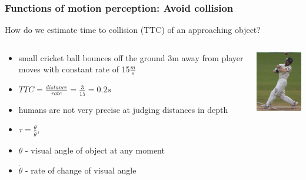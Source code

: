 \documentclass[]{beamer}
\begin{document}
\begin{frame}
\frametitle{Functions of motion perception: Avoid collision}
\begin{overlayarea}{110mm}{70mm}
How do we estimate time to collision (TTC) of an approaching object?\begin{columns}[T]
\begin{column}{70mm}
\begin{itemize}
 \item small cricket ball bounces off the ground 3m away from player moves with constant rate of 15$\frac{m}{s}$
 \item $TTC = \frac{distance}{rate} = \frac{3}{15} = 0.2s$
 \item humans are not very precise at judging distances in depth
 \item $\tau = \frac{\theta}{\dot{\theta}}$, 
  \item[] $\theta$ - visual angle of object at any moment
  \item[] $\dot{\theta}$ - rate of change of visual angle 
\end{itemize}
\end{column}

\begin{column}{50mm}
\begin{center}
\includegraphics[width=30mm]{figs/l7/ttc.png} 
\end{center}
\end{column}
 \end{columns}
\end{overlayarea}
\end{frame}
\end{document}
